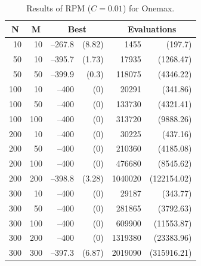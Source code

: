 \begin{table}[tb]
\centering
\caption{Results of RPM ($C=0.01$) for Onemax.}
\begin{tabular}{|r|r|rr|rr|}
\hline
\multicolumn{1}{|c|}{N} & \multicolumn{1}{|c|}{M} & 
\multicolumn{2}{c|}{Best} & \multicolumn{2}{c|}{Evaluations} \\ \hline
10 & 10 & --267.8 &  (8.82) & 1455 &  (197.7) \\ \hline
50 & 10 & --395.7 &  (1.73) & 17935 &  (1268.47) \\ \hline
50 & 50 & --399.9 &  (0.3) & 118075 &  (4346.22) \\ \hline
100 & 10 & --400 &  (0) & 20291 &  (341.86) \\ \hline
100 & 50 & --400 &  (0) & 133730 &  (4321.41) \\ \hline
100 & 100 & --400 &  (0) & 313720 &  (9888.26) \\ \hline
200 & 10 & --400 &  (0) & 30225 &  (437.16) \\ \hline
200 & 50 & --400 &  (0) & 210360 &  (4185.08) \\ \hline
200 & 100 & --400 &  (0) & 476680 &  (8545.62) \\ \hline
200 & 200 & --398.8 &  (3.28) & 1040020 &  (122154.02) \\ \hline
300 & 10 & --400 &  (0) & 29187 &  (343.77) \\ \hline
300 & 50 & --400 &  (0) & 281865 &  (3792.63) \\ \hline
300 & 100 & --400 &  (0) & 609900 &  (11553.87) \\ \hline
300 & 200 & --400 &  (0) & 1319380 &  (23383.96) \\ \hline
300 & 300 & --397.3 &  (6.87) & 2019090 &  (315916.21) \\ \hline
\end{tabular}
\label{result_0d_rpm}
\end{table}

